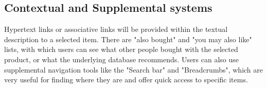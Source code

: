 \subsection{Contextual and Supplemental systems}
Hypertext links or associative links will be provided within the textual description to a selected item. There are "also bought" and "you may also like" lists, with which users can see what other people bought with the selected product, or what the underlying database recommends. Users can also use supplemental navigation tools like the "Search bar" and "Breadcrumbs", which are very useful for finding where they are and offer quick access to specific items.



